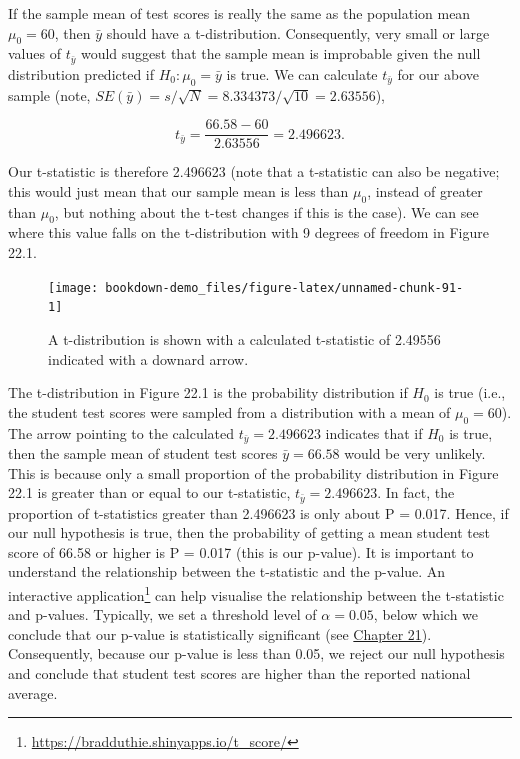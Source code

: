 \documentclass[
]{scrbook}
\begin{document}
If the sample mean of test scores is really the same as the population mean \(\mu_{0} = 60\), then \(\bar{y}\) should have a t-distribution.
Consequently, very small or large values of \(t_{\bar{y}}\) would suggest that the sample mean is improbable given the null distribution predicted if \(H_{0}: \mu_{0} = \bar{y}\) is true.
We can calculate \(t_{\bar{y}}\) for our above sample (note, \(SE(\bar{y}) = s/\sqrt{N} = 8.334373 / \sqrt{10} = 2.63556\)),

\[t_{\bar{y}} = \frac{66.58 - 60}{2.63556} = 2.496623.\]

Our t-statistic is therefore 2.496623 (note that a t-statistic can also be negative; this would just mean that our sample mean is less than \(\mu_{0}\), instead of greater than \(\mu_{0}\), but nothing about the t-test changes if this is the case).
We can see where this value falls on the t-distribution with 9 degrees of freedom in Figure 22.1.

\begin{figure}
\texttt{[image: bookdown-demo\_files/figure-latex/unnamed-chunk-91-1]} \caption{A t-distribution is shown with a calculated t-statistic of 2.49556 indicated with a downard arrow.}\label{fig:unnamed-chunk-91}
\end{figure}

The t-distribution in Figure 22.1 is the probability distribution if \(H_{0}\) is true (i.e., the student test scores were sampled from a distribution with a mean of \(\mu_{0} = 60\)).
The arrow pointing to the calculated \(t_{\bar{y}} = 2.496623\) indicates that if \(H_{0}\) is true, then the sample mean of student test scores \(\bar{y} = 66.58\) would be very unlikely.
This is because only a small proportion of the probability distribution in Figure 22.1 is greater than or equal to our t-statistic, \(t_{\bar{y}} = 2.496623\).
In fact, the proportion of t-statistics greater than 2.496623 is only about P = 0.017.
Hence, if our null hypothesis is true, then the probability of getting a mean student test score of 66.58 or higher is P = 0.017 (this is our p-value).
It is important to understand the relationship between the t-statistic and the p-value.
An interactive application\footnote{\url{https://bradduthie.shinyapps.io/t_score/}} can help visualise the relationship between the t-statistic and p-values.
Typically, we set a threshold level of \(\alpha = 0.05\), below which we conclude that our p-value is statistically significant (see \protect\hyperlink{Chapter_21}{Chapter 21}).
Consequently, because our p-value is less than 0.05, we reject our null hypothesis and conclude that student test scores are higher than the reported national average.
\end{document}
